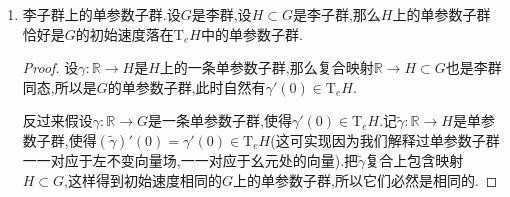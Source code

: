 \begin{enumerate}
\begin{proof}
    	下面我们验证$\gamma(t)=e^{tA}$是光滑的,并且满足这个方程,并且每个$\gamma(t)$是可逆方阵,按照$\gamma(0)=I_n$就得到它是$A^L$的以单位矩阵为起始点的积分曲线,这就说明$\gamma$是$A$生成的单参数子群.首先验证它满足这个方程,这是因为$\gamma'(t)=\sum_{k\ge1}\frac{k}{k!}t^{k-1}A^k=\left(\sum_{k\ge1}\frac{1}{(k-1)!}(tA)^{k-1}\right)A=\gamma(t)A$.并且这个方程说明$\gamma(t)$本身是光滑的.
    	
    	最后验证$\gamma(t)$总是可逆的.记$\sigma(t)=\gamma(t)\gamma(-t)$,那么$\sigma$是$\mathrm{gl}(n,\mathbb{R})$上一条光滑曲线,并且有$\sigma'(t)=(\gamma(t)A)\gamma(-t)-\gamma(t)(A\gamma(-t))=0$,所以有$\sigma(t)\equiv\sigma(0)=I_n$.于是$\gamma(t)\gamma(-t)=I_n$,于是每个$\gamma(t)$是可逆矩阵.
    \end{proof}
    \item 李子群上的单参数子群.设$G$是李群,设$H\subset G$是李子群,那么$H$上的单参数子群恰好是$G$的初始速度落在$\mathrm{T}_eH$中的单参数子群.
    \begin{proof}
    	
    	设$\gamma:\mathbb{R}\to H$是$H$上的一条单参数子群,那么复合映射$\mathbb{R}\to H\subset G$也是李群同态,所以是$G$的单参数子群,此时自然有$\gamma'(0)\in\mathrm{T}_eH$.
    	
    	反过来假设$\gamma:\mathbb{R}\to G$是一条单参数子群,使得$\gamma'(0)\in\mathrm{T}_eH$.记$\widetilde{\gamma}:\mathbb{R}\to H$是单参数子群,使得$(\widetilde{\gamma})'(0)=\gamma'(0)\in\mathrm{T}_eH$(这可实现因为我们解释过单参数子群一一对应于左不变向量场,一一对应于幺元处的向量).把$\widetilde{\gamma}$复合上包含映射$H\subset G$,这样得到初始速度相同的$G$上的单参数子群,所以它们必然是相同的.
    \end{proof}
\end{enumerate}

